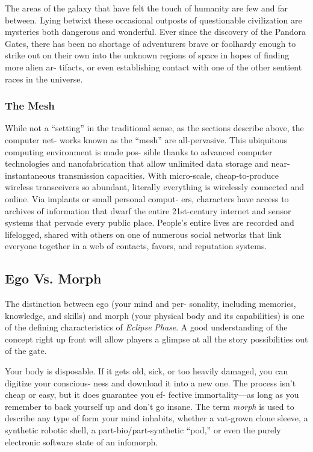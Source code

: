 The areas of the galaxy that have felt the touch of 
humanity are few and far between. Lying betwixt 
these occasional outposts of questionable civilization 
are mysteries both dangerous and wonderful. Ever 
since the discovery of the Pandora Gates, there has 
been no shortage of adventurers brave or foolhardy 
enough to strike out on their own into the unknown 
regions of space in hopes of finding more alien ar-
tifacts, or even establishing contact with one of the 
other sentient races in the universe.

\subsubsection{The Mesh}

While not a ``setting'' in the traditional sense, as 
the sections describe above, the computer net-
works known as the ``mesh'' are all-pervasive. This 
ubiquitous computing environment is made pos-
sible thanks to advanced computer technologies and 
nanofabrication that allow unlimited data storage 
and near-instantaneous transmission capacities. With 
micro-scale, cheap-to-produce wireless transceivers so 
abundant, literally everything is wirelessly connected 
and online. Via implants or small personal comput-
ers, characters have access to archives of information 
that dwarf the entire 21st-century internet and sensor 
systems that pervade every public place. People's 
entire lives are recorded and lifelogged, shared with 
others on one of numerous social networks that link 
everyone together in a web of contacts, favors, and 
reputation systems.

\subsection{Ego Vs. Morph}

The distinction between ego (your mind and per-
sonality, including memories, knowledge, and skills) 
and morph (your physical body and its capabilities) 
is one of the defining characteristics of \textit{Eclipse }
\textit{Phase}. A good understanding of the concept right 
up front will allow players a glimpse at all the story 
possibilities out of the gate.

Your body is disposable. If it gets old, sick, or too 
heavily damaged, you can digitize your conscious-
ness and download it into a new one. The process 
isn't cheap or easy, but it does guarantee you ef-
fective immortality—as long as you remember to 
back yourself up and don't go insane. The term 
\textit{morph }is used to describe any type of form your 
mind inhabits, whether a vat-grown clone sleeve, 
a synthetic robotic shell, a part-bio/part-synthetic 
``pod,'' or even the purely electronic software state 
of an infomorph.

